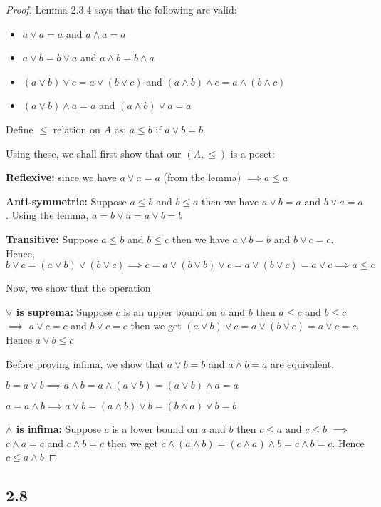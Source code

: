 \documentclass[12pt]{article}
\begin{document}
\begin{proof}
Lemma 2.3.4 says that the following are valid:
\begin{itemize}
    \item $a \vee a = a$ and $a \wedge a = a$
    \item $a \vee b = b \vee a$ and $a \wedge b = b \wedge a$
    \item $(a \vee b) \vee c = a \vee (b \vee c)$ and $(a \wedge b) \wedge c = a \wedge (b \wedge c)$
    \item $(a \vee b) \wedge a = a$ and $(a \wedge b) \vee a = a$
\end{itemize}

Define $\leq$ relation on $A$ as: $a \leq b$ if $a \vee b = b$.

Using these, we shall first show that our $(A, \leq)$ is a poset:

\textbf{Reflexive:} since we have $a \vee a = a$ (from the lemma) $\implies a \leq a$

\textbf{Anti-symmetric:} Suppose $a \leq b$ and $b \leq a$ then we have $a \vee b = a$ and $b \vee a = a$. Using the lemma, $a = b \vee a = a \vee b = b$

\textbf{Transitive:} Suppose $a \leq b$ and $b \leq c$ then we have $a \vee b = b$ and $b \vee c = c$. Hence, $b \vee c = (a \vee b) \vee (b \vee c) \implies c = a \vee (b \vee b) \vee c = a \vee (b \vee c) = a \vee c \implies a \leq c$

Now, we show that the operation 

\textbf{$\vee$ is suprema:} Suppose $c$ is an upper bound on $a$ and $b$ then $a \leq c$ and $b \leq c$ $\implies$ $a \vee c = c$ and $b \vee c = c$ then we get $(a \vee b) \vee c = a \vee (b \vee c) = a \vee c = c$. Hence $a \vee b \leq c$

Before proving infima, we show that $a \vee b = b$ and $a \wedge b = a$ are equivalent.

$b = a \vee b \implies a \wedge b = a \wedge (a \vee b) = (a \vee b) \wedge a = a$

$a = a \wedge b \implies a \vee b = (a \wedge b) \vee b = (b \wedge a) \vee b = b$

\textbf{$\wedge$ is infima:} Suppose $c$ is a lower bound on $a$ and $b$ then $c \leq a$ and $c \leq b$ $\implies$ $c \wedge a = c$ and $c \wedge b = c$ then we get $c \wedge (a \wedge b) = (c \wedge a) \wedge b = c \wedge b = c$. Hence $c \leq a \wedge b$
\end{proof}

\subsection*{2.8}
\end{document}
